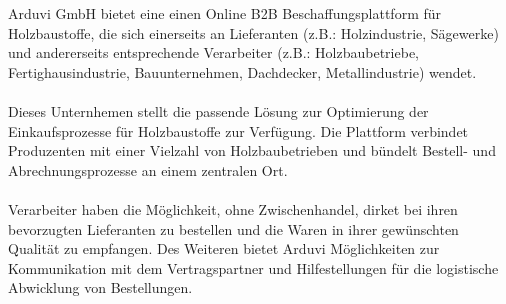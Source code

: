 Arduvi GmbH bietet eine einen Online B2B Beschaffungsplattform für Holzbaustoffe,
die sich einerseits an Lieferanten (z.B.: Holzindustrie, Sägewerke) und andererseits
entsprechende Verarbeiter (z.B.: Holzbaubetriebe, Fertighausindustrie, Bauunternehmen, 
Dachdecker, Metallindustrie) wendet. 
\\\\
Dieses Unternhemen stellt die passende Lösung zur Optimierung der Einkaufsprozesse für Holzbaustoffe
zur Verfügung. Die Plattform verbindet Produzenten mit einer Vielzahl von Holzbaubetrieben
und bündelt Bestell- und Abrechnungsprozesse an einem zentralen Ort.
\\\\
Verarbeiter haben die Möglichkeit, ohne Zwischenhandel, dirket bei ihren bevorzugten Lieferanten 
zu bestellen und die Waren in ihrer gewünschten Qualität zu empfangen. Des Weiteren bietet Arduvi
Möglichkeiten zur Kommunikation mit dem Vertragspartner und Hilfestellungen für die logistische
Abwicklung von Bestellungen.